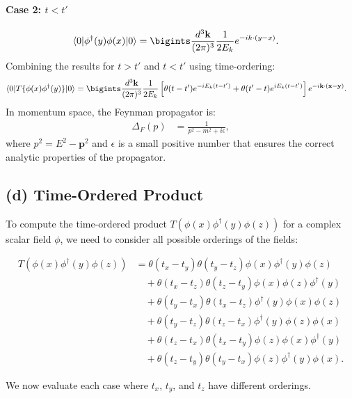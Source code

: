 {\paragraph{Case 2: \( t < t' \)}

\begin{align}
    \langle 0 | \phi^\dagger(y) \phi(x) | 0 \rangle &= \bigints\frac{d^3\mathbf{k}}{(2\pi)^{3}} \frac{1}{2E_k} e^{-ik \cdot (y - x)}.
\end{align}
Combining the results for \( t > t' \) and \( t < t' \) using time-ordering:
\begin{align}
    \langle 0 | T\{\phi(x) \phi^\dagger(y)\} | 0 \rangle &= \bigints\frac{d^3\mathbf{k}}{(2\pi)^3} \frac{1}{2E_k} \left[ \theta(t - t') e^{-iE_k (t - t')} + \theta(t' - t) e^{iE_k (t - t')} \right] e^{-i\mathbf{k} \cdot (\mathbf{x} - \mathbf{y})}.
\end{align}
In momentum space, the Feynman propagator is:
\begin{align}
    \Delta_F(p) &= \frac{1}{p^2 - m^2 + i \epsilon},
\end{align}
where \( p^2 = E^2 - \mathbf{p}^2 \) and \( \epsilon \) is a small positive number that ensures the correct analytic properties of the propagator.
\subsection*{(d) Time-Ordered Product}
To compute the time-ordered product \( T(\phi(x) \phi^\dagger(y) \phi(z)) \) for a complex scalar field \(\phi\), we need to consider all possible orderings of the fields:

\begin{align*}
T(\phi(x) \phi^\dagger(y) \phi(z)) &= \theta(t_x - t_y) \theta(t_y - t_z) \phi(x) \phi^\dagger(y) \phi(z) \\
&\quad + \theta(t_x - t_z) \theta(t_z - t_y) \phi(x) \phi(z) \phi^\dagger(y) \\
&\quad + \theta(t_y - t_x) \theta(t_x - t_z) \phi^\dagger(y) \phi(x) \phi(z) \\
&\quad + \theta(t_y - t_z) \theta(t_z - t_x) \phi^\dagger(y) \phi(z) \phi(x) \\
&\quad + \theta(t_z - t_x) \theta(t_x - t_y) \phi(z) \phi(x) \phi^\dagger(y) \\
&\quad + \theta(t_z - t_y) \theta(t_y - t_x) \phi(z) \phi^\dagger(y) \phi(x).
\end{align*}

We now evaluate each case where \( t_x \), \( t_y \), and \( t_z \) have different orderings.

}
